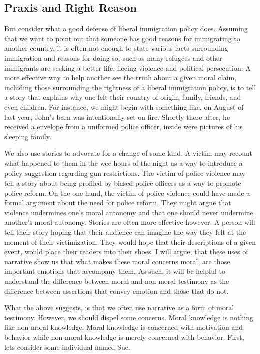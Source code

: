\documentclass[phdthesis,12pt,final]{wuthesis}
\theoremstyle{definition}
\theoremstyle{definition}
\theoremstyle{definition}
\theoremstyle{definition}
\theoremstyle{remark}
\begin{document}
\subsection*{Praxis and Right Reason}\label{praxis-and-right-reason}

But consider what a good defense of liberal immigration policy does. Assuming that we want to point out that someone has good reasons for immigrating to another country, it is often not enough to state various facts surrounding immigration and reasons for doing so, such as many refugees and other immigrants are seeking a better life, fleeing violence and political persecution. A more effective way to help another see the truth about a given moral claim, including those surrounding the rightness of a liberal immigration policy, is to tell a story that explains why one left their country of origin, family, friends, and even children. For instance, we might begin with something like, on August of last year, John's barn was intentionally set on fire. Shortly there after, he received a envelope from a uniformed police officer, inside were pictures of his sleeping family.

We also use stories to advocate for a change of some kind. A victim may recount what happened to them in the wee hours of the night as a way to introduce a policy suggestion regarding gun restrictions. The victim of police violence may tell a story about being profiled by biased police officers as a way to promote police reform. On the one hand, the victim of police violence could have made a formal argument about the need for police reform. They might argue that violence undermines one's moral autonomy and that one should never undermine another's moral autonomy. Stories are often more effective however. A person will tell their story hoping that their audience can imagine the way they felt at the moment of their victimization. They would hope that their descriptions of a given event, would place their readers into their shoes. I will argue, that these uses of narrative show us that what makes these moral concerns moral, are those important emotions that accompany them. As such, it will be helpful to understand the difference between moral and non-moral testimony as the difference between assertions that convey emotion and those that do not.

What the above suggests, is that we often use narrative as a form of moral testimony. However, we should dispel some concerns. Moral knowledge is nothing like non-moral knowledge. Moral knowledge is concerned with motivation and behavior while non-moral knowledge is merely concerned with behavior. First, lets consider some individual named Sue.
\end{document}
